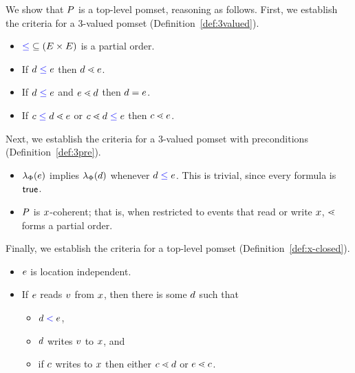 We show that $P$ is a top-level pomset, reasoning as follows.
First, we establish the criteria for a 3-valued pomset (Definition~\ref{def:3valued}).
\begin{itemize}
\item ${\mathrel{{\color{blue}\leq}}} \subseteq (E\times E)$ is a partial order.
\item If $d \mathrel{{\color{blue}\leq}} e$ then $d \lessdot e$.
\item If $d \mathrel{{\color{blue}\leq}} e$ and $e \lessdot d$ then $d = e$.
\item If $c \mathrel{{\color{blue}\leq}} d \lessdot e$ or $c \lessdot d \mathrel{{\color{blue}\leq}} e$ then $c \lessdot e$.
\end{itemize}

Next, we establish the criteria for a 3-valued pomset with preconditions (Definition~\ref{def:3pre}).
\begin{itemize}
\item $\lambda_{\Phi}(e)$ implies $\lambda_{\Phi}(d)$ whenever
  $d\mathrel{{\color{blue}\leq}}e$.  This is trivial, since every formula is $\mathsf{true}$.
\item $P$ is $x$-coherent; that is, when restricted to events that
  read or write $x$, $\lessdot$ forms a partial order.
\end{itemize}

Finally, we establish the criteria for a top-level pomset
(Definition~\ref{def:x-closed}).
\begin{itemize}
\item $e$ is location independent.
\item If $e$ reads $v$ from $x$, then there is some $d$ such that
  \begin{itemize}
  \item $d \mathrel{{\color{blue}<}} e$,  
  \item $d$ writes $v$ to $x$, and
  \item if $c$ writes to $x$
    then either $c \lessdot d$ or $e \lessdot c$.
  \end{itemize}    
\end{itemize}

